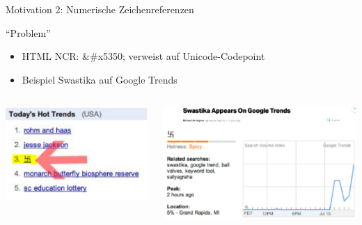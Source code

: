 \documentclass[xelatex,aspectratio=169]{beamer}
\begin{document}
\begin{frame}{Motivation 2: Numerische Zeichenreferenzen}
    \begin{alertblock}{\enquote{Problem}}
        \begin{itemize}
            \item HTML NCR: \&\#x5350; verweist auf Unicode-Codepoint
            \item Beispiel Swastika auf Google Trends
        \end{itemize}

    \end{alertblock}
    \begin{columns}
        \begin{column}{0.5\textwidth}
            \includegraphics[width=\textwidth]{img/codierung_swastika_1.png}
        \end{column}
        \begin{column}{0.5\textwidth}
            \includegraphics[width=\textwidth]{img/codierung_swastika_2.png}
        \end{column}
    \end{columns}
\end{frame}
\end{document}
